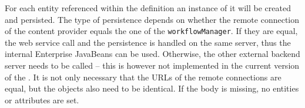 For each entity referenced within the definition an instance of it will be created and persisted. The type of persistence depends on whether the remote connection of the content provider equals the one of the \lstinline|workflowManager|. If they are equal, the web service call and the persistence is handled on the same server, thus the internal Enterprise JavaBeans can be used. Otherwise, the other external backend server needs to be called -- this is however not implemented in the current version of the \MD. It is not only necessary that the URLs of the remote connections are equal, but the objects also need to be identical.
If the body is missing, no entities or attributes are set.
